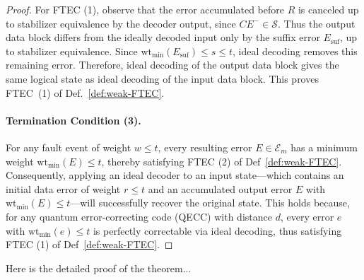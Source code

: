 \begin{proof}
For FTEC (1), observe that the error accumulated before $R$ is canceled
up to stabilizer equivalence by the decoder output, since $CE^-\in\mathcal S$.
Thus the output data block differs from the ideally decoded input only by the
suffix error $E_{\mathrm{suf}}$, up to stabilizer equivalence. Since
$\mathrm{wt}_{\min}(E_{\mathrm{suf}})\le s\le t$, ideal decoding removes this
remaining error. Therefore, ideal decoding of the output data block gives the
same logical state as ideal decoding of the input data block. This proves
FTEC~(1) of Def.~\ref{def:weak-FTEC}.

\paragraph{Termination Condition (3).}
For any fault event of weight $w \leq t$, every resulting error $E \in \mathcal{E}_m$ has a minimum weight $\mathrm{wt}_{\min}(E) \leq t$, thereby satisfying FTEC (2) of Def~\ref{def:weak-FTEC}. Consequently, applying an ideal decoder to an input state---which contains an initial data error of weight $r \leq t$ and an accumulated output error $E$ with $\mathrm{wt}_{\min}(E) \leq t$---will successfully recover the original state. This holds because, for any quantum error-correcting code (QECC) with distance $d$, every error $e$ with $\mathrm{wt}_{\min}(e) \leq t$ is perfectly correctable via ideal decoding, thus satisfying FTEC (1) of Def~\ref{def:weak-FTEC}.

\end{proof}

Here is the detailed proof of the theorem...



